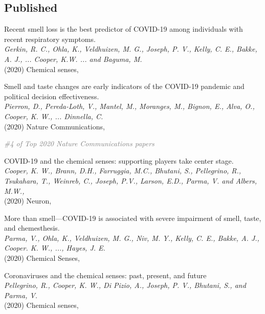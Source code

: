 \documentclass[10pt]{cooperCV2}
\begin{document}
\subsection{Published} 
\begin{etaremune}[resume,itemindent=-\bibhang, topsep=0pt,
				   itemsep=\bibsep,partopsep=0pt,parsep=0pt,leftmargin={\bibhang+\widthof{[999]}}] 
    
    \item Recent smell loss is the best predictor of COVID-19 among individuals with recent respiratory symptoms. \\
     \textit{Gerkin, R. C., Ohla, K., Veldhuizen, M. G., Joseph, P. V., Kelly, C. E., Bakke, A. J., ... Cooper, K.W. ... and Baguma, M. }\\
     (2020) Chemical senses, 
     
	
    \item Smell and taste changes are early indicators of the COVID-19 pandemic and political decision effectiveness. \\
     \textit{Pierron, D., Pereda-Loth, V., Mantel, M., Moranges, M., Bignon, E., Alva, O.,  Cooper, K. W., ... Dinnella, C. }\\
     (2020) Nature Communications, 
     
     	\begin{innerlist}
     	
	     \item  \textcolor{grey}{\textit{\#4 of Top 2020 Nature Communications papers} }
     	
     	\end{innerlist}
     
	
    \item COVID-19 and the chemical senses: supporting players take center stage. \\
     \textit{Cooper, K. W., Brann, D.H., Farruggia, M.C., Bhutani, S., Pellegrino, R., Tsukahara, T., Weinreb, C., Joseph, P.V., Larson, E.D., Parma, V. and Albers, M.W.,}\\
     (2020) Neuron, 
     
	
    \item More than smell—COVID-19 is associated with severe impairment of smell, taste, and chemesthesis. \\
     \textit{Parma, V., Ohla, K., Veldhuizen, M. G., Niv, M. Y., Kelly, C. E., Bakke, A. J., Cooper. K. W., ..., Hayes, J. E.}\\
     (2020) Chemical Senses, 
     
	
    \item Coronaviruses and the chemical senses: past, present, and future \\
     \textit{Pellegrino, R., Cooper, K. W., Di Pizio, A., Joseph, P. V., Bhutani, S., and Parma, V. }\\
     (2020) Chemical senses, 
     

\end{etaremune}
\end{document}
